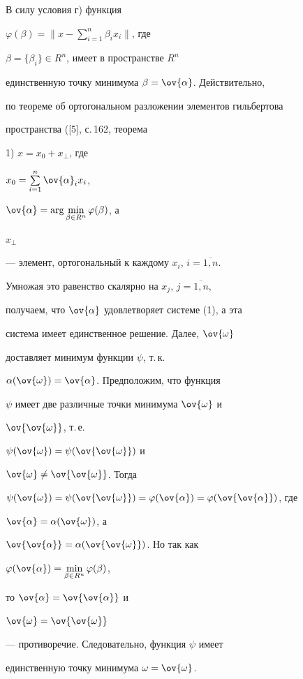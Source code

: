 \begin{pf}


В силу условия г) функция


$\varphi(\beta)=\Big\|x-


\sum\limits^n_{i=1}\beta_ix_i\Big\|$, где


$\beta=\{\beta_i\}\in R^n$, имеет в пространстве $R^n$


единственную точку минимума $\beta=\ov{\alpha}$. Действительно,


по теореме об ортогональном разложении элементов гильбертова


пространства ([5], с.\,162, теорема


1) $x=x_0+x_\bot$, где


$x_0=\sum\limits^n_{i=1}\ov{\alpha}_ix_i$,


$\ov{\alpha}=\arg\min\limits_{\beta\in R^n}\varphi(\beta)$, а


$x_\bot$


--- элемент, ортогональный к каждому $x_i$, $i=\overline{1,n}$.


Умножая это равенство скалярно на $x_j$, $j=\overline{1,n}$,


получаем, что $\ov{\alpha}$ удовлетворяет системе (1), а эта


система имеет единственное решение. Далее, $\ov{\omega}$


доставляет минимум функции $\psi$, т.\,к.


$\alpha(\ov{\omega})=\ov{\alpha}$. Предположим, что функция


$\psi$ имеет две различные точки минимума $\ov{\omega}$ и


$\ov{\ov{\omega}}$, т.\,е.


$\psi(\ov{\omega})=\psi(\ov{\ov{\omega}})$ и


$\ov{\omega}\neq\ov{\ov{\omega}}$. Тогда


$\psi(\ov{\omega})=\psi(\ov{\ov{\omega}})=\varphi(\ov{\alpha})=


\varphi(\ov{\ov{\alpha}})$, где


$\ov{\alpha}=\alpha(\ov{\omega})$, а


$\ov{\ov{\alpha}}=\alpha(\ov{\ov{\omega}})$. Но так как


$\varphi(\ov{\alpha})=\min\limits_{\beta\in R^n}\varphi(\beta)$,


то $\ov{\alpha}=\ov{\ov{\alpha}}$ и


$\ov{\omega}=\ov{\ov{\omega}}$


--- противоречие.  Следовательно, функция $\psi$ имеет


единственную точку минимума $\omega=\ov{\omega}$.


\end{pf}





